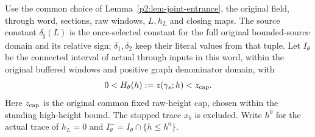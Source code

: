 \begin{proposition}
\label{p2:prop-unified-carrier-cover}
Use the common choice of Lemma~\ref{p2:lem-joint-entrance}, the original field,
through word, sections, raw windows, $L,h_L$ and closing maps.
The source constant $\delta_\sharp(L)$ is the once-selected constant
for the full original bounded-source domain and its relative sign;
$\delta_1,\delta_2$ keep their literal values from that tuple.
Let $I_\theta$ be the connected interval of actual through inputs in
this word, within the original buffered windows and positive graph
denominator domain, with
\[
             0<H_\theta(h):=z(\gamma_s;h)<z_{\rm cap}.
\]
Here $z_{\rm cap}$ is the original common fixed raw-height cap,
chosen within the standing high-height bound. The stopped trace $x_b$
is excluded. Write $h^0$ for the actual trace of $h_L=0$ and
$I_\theta^- = I_\theta\cap\{h\le h^0\}$.


\end{proposition}

